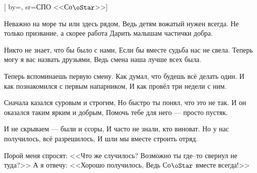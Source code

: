 [
  by={},
  sr={СПО <<Со$\oStar$>>}]



\pchk


\psk



\beginverse
Неважно на море ты или здесь рядом,
Ведь детям вожатый нужен всегда.
Не только призвание, а скорее работа
Дарить малышам частички добра.
\endverse


\beginchorus
Никто не знает, что бы было с нами,
Если бы вместе судьба нас не свела.
Теперь могу я вас назвать друзьями,
Ведь смена наша лучше всех была.
\endchorus


\beginverse
Теперь вспоминаешь первую смену.
Как думал, что будешь всё делать один.
И как познакомился с первым напарником, 
И как провёл три недели с ним.

Сначала казался суровым и строгим,
Но быстро ты понял, что это не так.
И он оказался таким ярким и добрым,
Помочь тебе для него --- просто пустяк.
\endverse


\beginverse
И не скрываем --- были и ссоры,
И часто не знали, кто виноват.
Но у нас получилось, всё разрешилось,
И шли мы вместе строить отряд.
\endverse


\beginverse
Порой меня спросят: <<Что же случилось?
Возможно ты где--то свернул не туда?>>
А я отвечу: <<Хорошо получилось,
Ведь Со$\oStar$ вместе всегда!>>
\endverse

\endsong


\beginscripture{}

\endscripture
